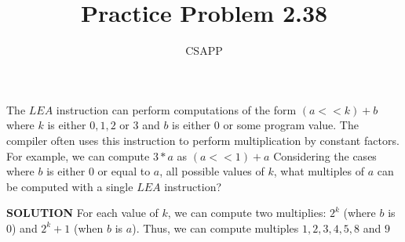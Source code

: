 \documentclass{article}
\title{{Practice Problem 2.38}}
\author{CSAPP}
\begin{document}
    \maketitle
    
    \begin{flushleft}
        The $LEA$ instruction can perform computations of the form
        $(a << k) + b$ where $k$ is either $0,1,2$ or  $3$ and $b$ is either $0$ or some
        program value. The compiler often uses this instruction to perform multiplication
        by constant factors. For example, we can compute $3 * a$ as $(a << 1) + a$
        Considering the cases where $b$ is either $0$ or equal to $a$, all possible 
        values of $k$, what multiples of $a$ can be computed with a single $LEA$ instruction?

        \smallskip

        \textbf{\small SOLUTION}
        For each value of $k$, we can compute two multiplies: $2^k$
        (where $b$ is $0$) and $2^k + 1$  (when $b$ is $a$).
        Thus, we can compute multiples $1,2,3,4,5,8$ and $9$
        
    \end{flushleft}
\end{document}
